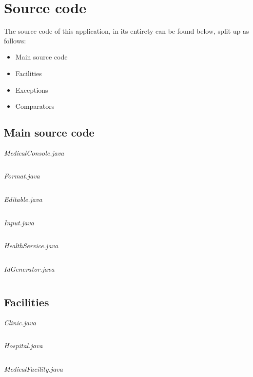 \documentclass{article}
\begin{document}
	\section{Source code}\label{sec:code} %
	The source code of this application, in its entirety can be found below, split up as follows: 
	\begin{itemize}
		\item Main source code 
		\item Facilities
		\item Exceptions
		\item Comparators
	\end{itemize}

	\subsection{Main source code}\label{sub:main_source_code} %
	\textit{MedicalConsole.java}
	\inputminted{java}{src/main/java/com/yvesstraten/medicalconsole/MedicalConsole.java}

	\pagebreak

	\textit{Format.java}
	\inputminted{java}{src/main/java/com/yvesstraten/medicalconsole/Format.java}

	\textit{Editable.java}
	\inputminted{java}{src/main/java/com/yvesstraten/medicalconsole/Editable.java}

	\textit{Input.java}
	\inputminted{java}{src/main/java/com/yvesstraten/medicalconsole/Input.java}

	\pagebreak

	\textit{HealthService.java}
	\inputminted{java}{src/main/java/com/yvesstraten/medicalconsole/HealthService.java}

	\textit{IdGenerator.java}
	\inputminted{java}{src/main/java/com/yvesstraten/medicalconsole/IdGenerator.java}

	\subsection{Facilities}\label{sub:facilities} %
	\textit{Clinic.java}
	\inputminted{java}{src/main/java/com/yvesstraten/medicalconsole/facilities/Clinic.java}

	\pagebreak

	\textit{Hospital.java}
	\inputminted{java}{src/main/java/com/yvesstraten/medicalconsole/facilities/Hospital.java}

	\textit{MedicalFacility.java}
	\inputminted{java}{src/main/java/com/yvesstraten/medicalconsole/facilities/MedicalFacility.java}
\end{document}
